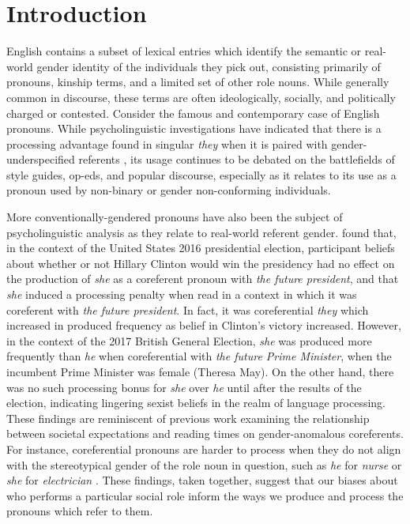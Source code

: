 \documentclass[10pt,letterpaper]{article}
\begin{document}
	\section{Introduction}
	English contains a subset of lexical entries which identify the semantic or real-world gender identity of the individuals they pick out, consisting primarily of pronouns, kinship terms, and a limited set of other role nouns. While generally common in discourse, these terms are often ideologically, socially, and politically charged or contested. Consider the famous and contemporary case of English pronouns. While psycholinguistic investigations have indicated that there is a processing advantage found in singular \textit{they} when it is paired with gender-underspecified referents \parencite{foertsch1997search,doherty2017gender,ackerman}, its usage continues to be debated on the battlefields of style guides, op-eds, and popular discourse, especially as it relates to its use as a pronoun used by non-binary or gender non-conforming individuals.  \par 
	More conventionally-gendered pronouns have also been the subject of psycholinguistic analysis as they relate to real-world referent gender. \textcite{von2020implicit} found that, in the context of the United States 2016 presidential election, participant beliefs about whether or not Hillary Clinton would win the presidency had no effect on the production of \textit{she} as a coreferent pronoun with \textit{the future president}, and that \textit{she} induced a processing penalty when read in a context in which it was coreferent with \textit{the future president}. In fact, it was coreferential \textit{they} which increased in produced frequency as belief in Clinton's victory increased. However, in the context of the 2017 British General Election, \textit{she} was produced more frequently than \textit{he} when coreferential with \textit{the future Prime Minister}, when the incumbent Prime Minister was female (Theresa May). On the other hand, there was no such processing bonus for \textit{she} over \textit{he} until after the results of the election, indicating lingering sexist beliefs in the realm of language processing. These findings are reminiscent of previous work examining the relationship between societal expectations and reading times on gender-anomalous coreferents. For instance, coreferential pronouns are harder to process when they do not align with the stereotypical gender of the role noun in question, such as \textit{he} for \textit{nurse} or \textit{she} for \textit{electrician} \parencite{foertsch1997search,duffy2004violating}. These findings, taken together, suggest that our biases about who performs a particular social role inform the ways we produce and process the pronouns which refer to them.\par 	
\end{document}
